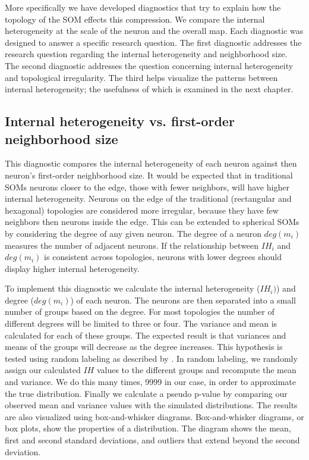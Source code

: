 More specifically we have developed diagnostics that try to explain how the
topology of the SOM effects this compression.  We compare the internal
heterogeneity at the scale of the neuron and the overall map.  Each diagnostic
was designed to answer a specific research question.  The first diagnostic
addresses the research question regarding the internal heterogeneity and
neighborhood size.  The second diagnostic addresses the question concerning
internal heterogeneity and topological irregularity.  The third helps
visualize the patterns between internal heterogeneity; the usefulness of which
is examined in the next chapter.

\subsection{Internal heterogeneity vs. first-order neighborhood size}
\label{q1}
This diagnostic compares the internal heterogeneity of each neuron against
then neuron's first-order neighborhood size.  It would be expected that in
traditional SOMs neurons closer to the edge, those with fewer neighbors, will
have higher internal heterogeneity. Neurons on the edge of the traditional
(rectangular and hexagonal) topologies are considered more irregular, because
they have few neighbors then neurons inside the edge.  This can be extended to
spherical SOMs by considering the degree of any given neuron.  The degree of a
neuron $deg(m_i)$ measures the number of adjacent neurons.  If the
relationship between $IH_i$ and $deg(m_i)$ is consistent across topologies,
neurons with lower degrees should display higher internal heterogeneity.

To implement this diagnostic we calculate the internal heterogeneity ($IH_i)$)
and degree ($deg(m_i)$) of each neuron. The neurons are then separated into a small number of
groups based on the degree.  For most topologies the number of
different degrees will be limited to three or four.  The variance and mean
is calculated for each of these groups.  The expected result is that
variances and means of the groups will decrease as the degree increases.  This
hypothesis is tested using random labeling as described by \cite{siss2004}.
In random labeling, we randomly assign our calculated $IH$ values to the
different groups and recompute the mean and variance.  We do this many times,
9999 in our case, in order to approximate the true distribution. Finally we
calculate a pseudo p-value by comparing our observed mean and variance values
with the simulated distributions.  The results are also visualized using
box-and-whisker diagrams. Box-and-whisker diagrams, or box plots, show the
properties of a distribution.  The diagram shows the mean, first and second
standard deviations, and outliers that extend beyond the second deviation.

